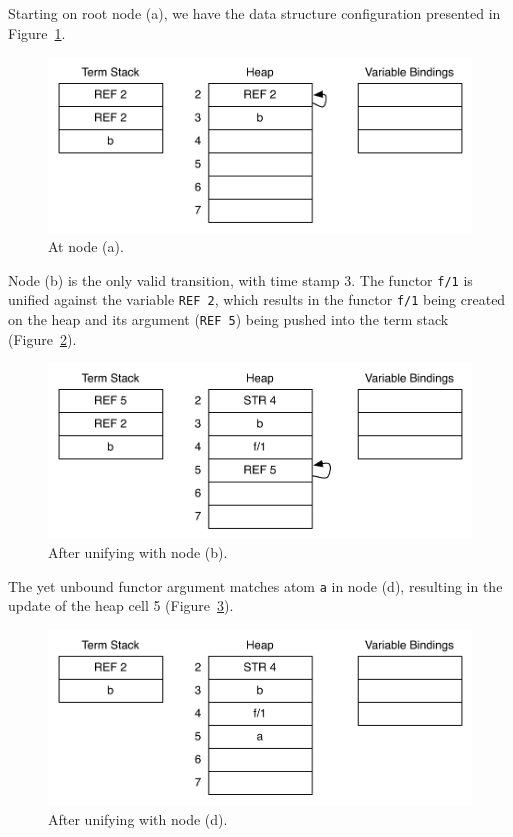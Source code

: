 Starting on root node (a), we have the data structure configuration presented in Figure~\ref{fig:collect_variable1}.

\begin{figure}[H]
  \centering
    \includegraphics[scale=0.5]{collect_variable1.pdf}
  \caption{At node (a).}
  \label{fig:collect_variable1}
\end{figure}

Node (b) is the only valid transition, with time stamp 3.
The functor \texttt{f/1} is unified against the variable \texttt{REF 2},
which results in the functor \texttt{f/1} being created on the heap
and its argument (\texttt{REF 5}) being pushed into the term stack
(Figure~\ref{fig:collect_variable2}).

\begin{figure}[H]
  \centering
    \includegraphics[scale=0.5]{collect_variable2.pdf}
  \caption{After unifying with node (b).}
  \label{fig:collect_variable2}
\end{figure}

The yet unbound functor argument matches atom \texttt{a} in node (d),
resulting in the update of the heap cell 5 (Figure~\ref{fig:collect_variable3}).

\begin{figure}[H]
  \centering
    \includegraphics[scale=0.5]{collect_variable3.pdf}
  \caption{After unifying with node (d).}
  \label{fig:collect_variable3}
\end{figure}

